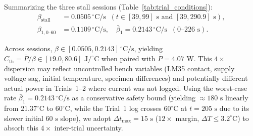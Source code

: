 \documentclass[lettersize,journal]{IEEEtran}
\begin{document}
	Summarizing the three stall sessions (Table~\ref{tab:trial_conditions}):
	\begin{align}
		\beta_{\text{stall}} &= 0.0505\,^\circ\text{C/s} \;\; (t \in [39, 99]\text{ s and } [39, 290.9]\text{ s}), \nonumber \\
		\beta_{1,0\text{--}60} &= 0.1109\,^\circ\text{C/s}, \quad \bar{\beta}_1 = 0.2143\,^\circ\text{C/s} \;\; (0\text{--}226\text{ s}).
		\label{eq:heating_rate}
	\end{align}
	\begin{table}[!t]
		\centering
		\caption{Experimental Conditions Across Thermal Stall Bench Sessions}
		\label{tab:trial_conditions}
		\scriptsize
		\setlength{\tabcolsep}{2.2pt}
		\renewcommand{\arraystretch}{0.88}
	\end{table}
	Across sessions, $\beta \in [0.0505, 0.2143]\,^\circ\text{C/s}$, yielding $C_{\text{th}} = \bar{P}/\beta \in [19.0, 80.6]\text{ J/}^\circ\text{C}$ when paired with $\bar{P} = 4.07\text{ W}$. This $4\times$ dispersion may reflect uncontrolled bench variables (LM35 contact, supply voltage sag, initial temperature, specimen differences) and potentially different actual power in Trials~1--2 where current was not logged. Using the worst-case rate $\bar{\beta}_1 = 0.2143\,^\circ\text{C/s}$ as a conservative safety bound (yielding $\approx 180\text{ s}$ linearly from $21.37^\circ\text{C}$ to $60^\circ\text{C}$, while the Trial~1 log crosses $60^\circ\text{C}$ at $t = 205\text{ s}$ due to its slower initial $60\text{ s}$ slope), we adopt $\Delta t_{\max} = 15\text{ s}$ ($12\times$ margin, $\Delta T \le 3.2^\circ\text{C}$) to absorb this $4\times$ inter-trial uncertainty.
	
\end{document}
